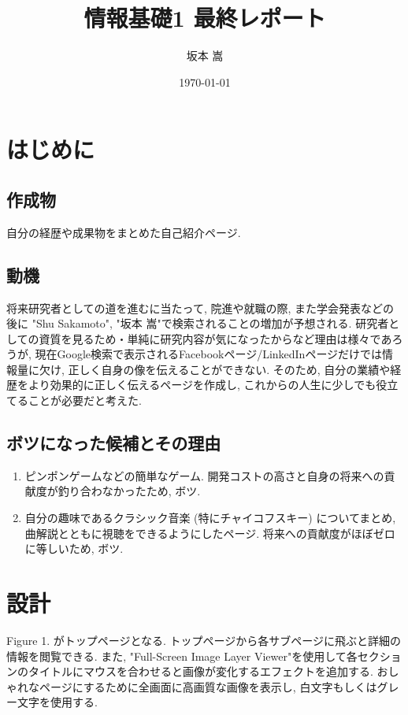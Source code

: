 \documentclass{jarticle}
\title{情報基礎1 最終レポート}
\author{坂本 嵩}
\date{\today}
\begin{document}
\maketitle

\section{はじめに}
\subsection{作成物} 自分の経歴や成果物をまとめた自己紹介ページ.	

\subsection{動機} 
将来研究者としての道を進むに当たって, 院進や就職の際, また学会発表などの後に "Shu Sakamoto", "坂本 嵩"で検索されることの増加が予想される. 研究者としての資質を見るため・単純に研究内容が気になったからなど理由は様々であろうが, 現在Google検索で表示されるFacebookページ/LinkedInページだけでは情報量に欠け, 正しく自身の像を伝えることができない. そのため, 自分の業績や経歴をより効果的に正しく伝えるページを作成し, これからの人生に少しでも役立てることが必要だと考えた.

\subsection{ボツになった候補とその理由}
\begin{enumerate}
	\item 
	ピンポンゲームなどの簡単なゲーム. 開発コストの高さと自身の将来への貢献度が釣り合わなかったため, ボツ.
	\item
	自分の趣味であるクラシック音楽 (特にチャイコフスキー) についてまとめ, 曲解説とともに視聴をできるようにしたページ. 将来への貢献度がほぼゼロに等しいため, ボツ.
\end{enumerate}

\section{設計}

Figure 1. がトップページとなる. トップページから各サブページに飛ぶと詳細の情報を閲覧できる. また, "Full-Screen Image Layer Viewer"\cite{ettrics}を使用して各セクションのタイトルにマウスを合わせると画像が変化するエフェクトを追加する. おしゃれなページにするために全画面に高画質な画像を表示し, 白文字もしくはグレー文字を使用する.
\end{document}
